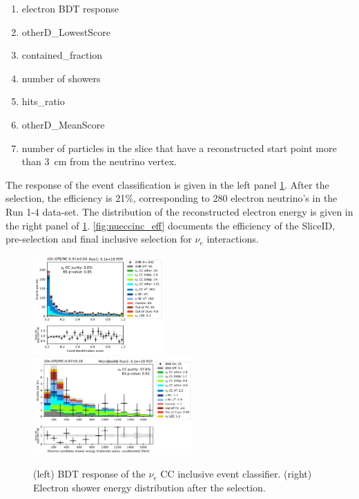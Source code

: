 \begin{enumerate}
    \item electron BDT response
    \item otherD\_LowestScore
    \item contained\_fraction
    \item number of showers
    \item hits\_ratio
    \item otherD\_MeanScore
    \item number of particles in the slice that have a reconstructed start point more than \SI{3}{\cm} from the neutrino vertex.
\end{enumerate}
The response of the event classification is given in the left panel \cref{fig:pre_event_score}. After the selection, the efficiency is 21\%, corresponding to 280 electron neutrino's in the Run 1-4 data-set. The distribution of the reconstructed electron energy is given in the right panel of \cref{fig:pre_event_score}. \cref{fig:nueccinc_eff} documents the efficiency of the SliceID, pre-selection and final inclusive selection for $\nu_e$ interactions.



\begin{figure}[H]
    \centering
    \includegraphics[width=0.445\textwidth]{NueCCsel/Images/run1/pre_event_score.pdf}
    \includegraphics[width=0.545\textwidth]{NueCCsel/Images/run1/nue_shower_energy_y.pdf}
    \caption{(left) BDT response of the $\nu_e$ CC inclusive event classifier. (right) Electron shower energy distribution after the selection.}
    \label{fig:pre_event_score}
\end{figure}


